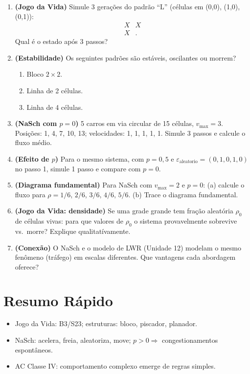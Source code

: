 \documentclass[12pt,a4paper]{article}
\begin{document}
\begin{enumerate}
  \item \textbf{(Jogo da Vida)} Simule 3 gera\c{c}\~oes do padr\~ao ``L'' (c\'elulas em (0,0), (1,0), (0,1)):
  \[
  \begin{array}{cc} X & X \\ X & . \end{array}
  \]
  Qual \'e o estado ap\'os 3 passos?

  \item \textbf{(Estabilidade)} Os seguintes padr\~oes s\~ao est\'aveis, oscilantes ou morrem?
    \begin{enumerate}
      \item[$a.$] Bloco $2\times2$.
      \item[$b.$] Linha de 2 c\'elulas.
      \item[$c.$] Linha de 4 c\'elulas.
    \end{enumerate}

  \item \textbf{(NaSch com $p=0$)} 5 carros em via circular de 15 c\'elulas, $v_\text{max}=3$. Posi\c{c}\~oes: 1, 4, 7, 10, 13; velocidades: 1, 1, 1, 1, 1. Simule 3 passos e calcule o fluxo m\'edio.
  
  \item \textbf{(Efeito de $p$)} Para o mesmo sistema, com $p=0{,}5$ e $\varepsilon_\text{aleatorio} = (0, 1, 0, 1, 0)$ no passo 1, simule 1 passo e compare com $p=0$.
  
  \item \textbf{(Diagrama fundamental)} Para NaSch com $v_\text{max}=2$ e $p=0$: (a) calcule o fluxo para $\rho = 1/6$, $2/6$, $3/6$, $4/6$, $5/6$. (b) Trace o diagrama fundamental.
  
  \item \textbf{(Jogo da Vida: densidade)} Se uma grade grande tem fra\c{c}\~ao aleat\'oria $\rho_0$ de c\'elulas vivas: para que valores de $\rho_0$ o sistema provavelmente sobrevive vs.\ morre? Explique qualitat\'ivamente.
  
  \item \textbf{(Conex\~ao)} O NaSch e o modelo de LWR (Unidade 12) modelam o mesmo fen\^omeno (tr\'afego) em escalas diferentes. Que vantagens cada abordagem oferece?
\end{enumerate}

\section*{Resumo R\'apido}
\begin{itemize}
  \item Jogo da Vida: B3/S23; estruturas: bloco, piscador, planador.
  \item NaSch: acelera, freia, aleatoriza, move; $p>0 \Rightarrow$ congestionamentos espont\^aneos.
  \item AC Classe IV: comportamento complexo emerge de regras simples.
\end{itemize}
\end{document}
